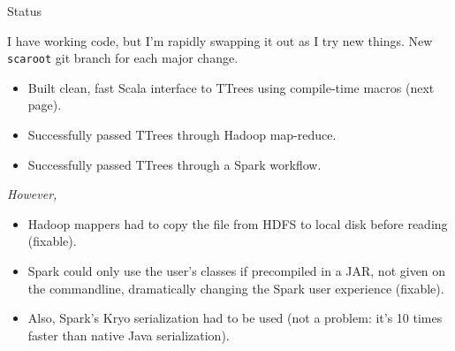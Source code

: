 \documentclass{beamer}
\begin{document}
\begin{frame}{Status}

\begin{block}{}
\vspace{-\baselineskip}
I have working code, but I'm rapidly swapping it out as I try new things. New {\tt scaroot} git branch for each major change.
\end{block}

\begin{itemize}
\item Built clean, fast Scala interface to TTrees using compile-time macros (next page).
\item Successfully passed TTrees through Hadoop map-reduce.
\item Successfully passed TTrees through a Spark workflow.
\end{itemize}

{\it However,}
\begin{itemize}
\item Hadoop mappers had to copy the file from HDFS to local disk before reading (fixable).
\item Spark could only use the user's classes if precompiled in a JAR, not given on the commandline, dramatically changing the Spark user experience (fixable).
\item Also, Spark's Kryo serialization had to be used (not a problem: it's 10 times faster than native Java serialization).
\end{itemize}
\end{frame}
\end{document}
